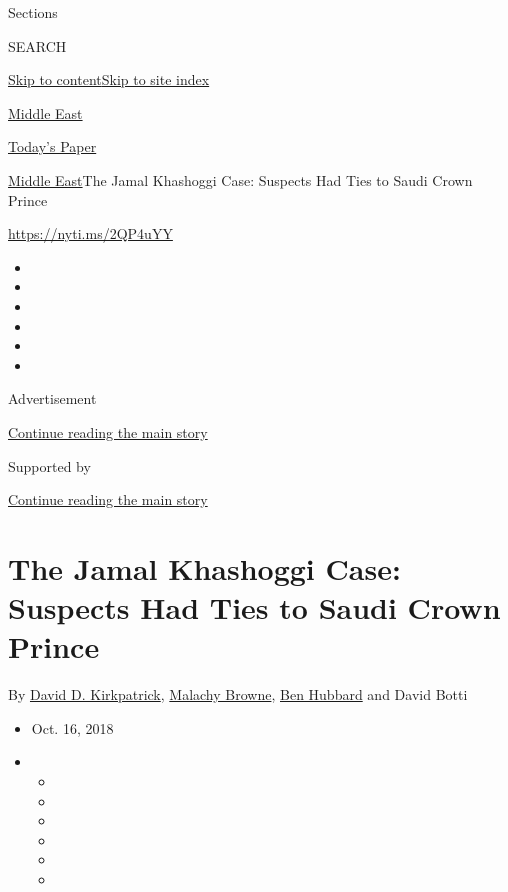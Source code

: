Sections

SEARCH

\protect\hyperlink{site-content}{Skip to
content}\protect\hyperlink{site-index}{Skip to site index}

\href{https://www.nytimes.com/section/world/middleeast}{Middle East}

\href{https://myaccount.nytimes.com/auth/login?response_type=cookie\&client_id=vi}{}

\href{https://www.nytimes.com/section/todayspaper}{Today's Paper}

\href{/section/world/middleeast}{Middle East}\textbar{}The Jamal
Khashoggi Case: Suspects Had Ties to Saudi Crown Prince

\url{https://nyti.ms/2QP4uYY}

\begin{itemize}
\item
\item
\item
\item
\item
\item
\end{itemize}

Advertisement

\protect\hyperlink{after-top}{Continue reading the main story}

Supported by

\protect\hyperlink{after-sponsor}{Continue reading the main story}

\hypertarget{the-jamal-khashoggi-case-suspects-had-ties-to-saudi-crown-prince}{%
\section{The Jamal Khashoggi Case: Suspects Had Ties to Saudi Crown
Prince}\label{the-jamal-khashoggi-case-suspects-had-ties-to-saudi-crown-prince}}

By \href{https://www.nytimes.com/by/david-d-kirkpatrick}{David D.
Kirkpatrick}, \href{https://www.nytimes.com/by/malachy-browne}{Malachy
Browne}, \href{https://www.nytimes.com/by/ben-hubbard}{Ben Hubbard} and
David Botti

\begin{itemize}
\item
  Oct. 16, 2018
\item
  \begin{itemize}
  \item
  \item
  \item
  \item
  \item
  \item
  \end{itemize}
\end{itemize}

